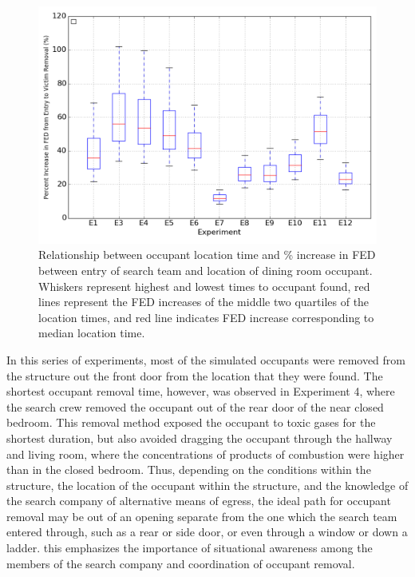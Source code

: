\begin{figure}[!ht]
	\centering
	\includegraphics[width=.75\textwidth]{../Figures/victim_removal/V1}
	\caption[Relationship between occupant location time and increase in FED between entry of search team and location of dining room occupant]{Relationship between occupant location time and \% increase in FED between entry of search team and location of dining room occupant. Whiskers represent highest and lowest times to occupant found, red lines represent the FED increases of the middle two quartiles of the location times, and red line indicates FED increase corresponding to median location time. }
	\label{fig:vic_removal}
\end{figure}

In this series of experiments, most of the simulated occupants were removed from the structure out the front door from the location that they were found. The shortest occupant removal time, however, was observed in Experiment 4, where the search crew removed the occupant out of the rear door of the near closed bedroom. This removal method exposed the occupant to toxic gases for the shortest duration, but also avoided dragging the occupant through the hallway and living room, where the  concentrations of products of combustion were higher than in the closed bedroom. Thus, depending on the conditions within the structure, the location of the occupant within the structure, and the knowledge of the search company of alternative means of egress, the ideal path for occupant removal may be out of an opening separate from the one which the search team entered through, such as a rear or side door, or even through a window or down a ladder. this emphasizes the importance of situational awareness among the members of the search company and coordination of occupant removal. 